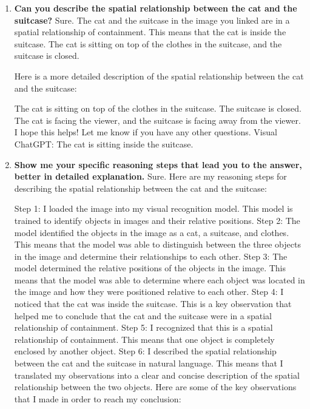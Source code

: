     \begin{enumerate}
        \item \textbf{Can you describe the spatial relationship between the cat and the suitcase?}
        \subitem Sure. The cat and the suitcase in the image you linked are in a spatial relationship of containment. This means that the cat is inside the suitcase. The cat is sitting on top of the clothes in the suitcase, and the suitcase is closed.

        Here is a more detailed description of the spatial relationship between the cat and the suitcase:
        
        The cat is sitting on top of the clothes in the suitcase.
        The suitcase is closed.
        The cat is facing the viewer, and the suitcase is facing away from the viewer.
        I hope this helps! Let me know if you have any other questions.
        \subitem Visual ChatGPT: The cat is sitting inside the suitcase. 
        \item \textbf{Show me your specific reasoning steps that lead you to the answer, better in detailed explanation.}
        \subitem 
        Sure. Here are my reasoning steps for describing the spatial relationship between the cat and the suitcase:
        
        Step 1: I loaded the image into my visual recognition model. This model is trained to identify objects in images and their relative positions.
        Step 2: The model identified the objects in the image as a cat, a suitcase, and clothes. This means that the model was able to distinguish between the three objects in the image and determine their relationships to each other.
        Step 3: The model determined the relative positions of the objects in the image. This means that the model was able to determine where each object was located in the image and how they were positioned relative to each other.
        Step 4: I noticed that the cat was inside the suitcase. This is a key observation that helped me to conclude that the cat and the suitcase were in a spatial relationship of containment.
        Step 5: I recognized that this is a spatial relationship of containment. This means that one object is completely enclosed by another object.
        Step 6: I described the spatial relationship between the cat and the suitcase in natural language. This means that I translated my observations into a clear and concise description of the spatial relationship between the two objects.
        Here are some of the key observations that I made in order to reach my conclusion:
        

\end{enumerate}
